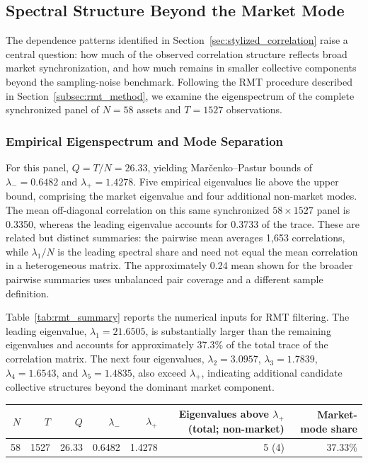 \subsection{Spectral Structure Beyond the Market Mode}
\label{sec:rmt}

The dependence patterns identified in Section~\ref{sec:stylized_correlation} raise a central question: how much of the observed correlation structure reflects broad market synchronization, and how much remains in smaller collective components beyond the sampling-noise benchmark. Following the RMT procedure described in Section~\ref{subsec:rmt_method}, we examine the eigenspectrum of the complete synchronized panel of $N=58$ assets and $T=1527$ observations.

\subsubsection{Empirical Eigenspectrum and Mode Separation
}


For this panel, $Q=T/N=26.33$, yielding Mar\v{c}enko--Pastur bounds of $\lambda_-=0.6482$ and $\lambda_+=1.4278$. Five empirical eigenvalues lie above the upper bound, comprising the market eigenvalue and four additional non-market modes. The mean off-diagonal correlation on this same synchronized $58\times1527$ panel is 0.3350, whereas the leading eigenvalue accounts for 0.3733 of the trace. These are related but distinct summaries: the pairwise mean averages 1,653 correlations, while $\lambda_1/N$ is the leading spectral share and need not equal the mean correlation in a heterogeneous matrix. The approximately 0.24 mean shown for the broader pairwise summaries uses unbalanced pair coverage and a different sample definition.

Table~\ref{tab:rmt_summary} reports the numerical inputs for RMT filtering. The leading eigenvalue, $\lambda_1=21.6505$, is substantially larger than the remaining eigenvalues and accounts for approximately 37.3\% of the total trace of the correlation matrix. The next four eigenvalues, $\lambda_2=3.0957$, $\lambda_3=1.7839$, $\lambda_4=1.6543$, and $\lambda_5=1.4835$, also exceed $\lambda_+$, indicating additional candidate collective structures beyond the dominant market component.

\begin{center}
\label{tab:rmt_summary}
\setlength{\tabcolsep}{4pt}
\begin{tabular}{rrrrrrr}
\toprule
$N$ & $T$ & $Q$ & $\lambda_-$ & $\lambda_+$ &
Eigenvalues above $\lambda_+$ (total; non-market) & Market-mode share \\
\midrule
58 & 1527 & 26.33 & 0.6482 & 1.4278 & 5 (4) & 37.33\% \\
\bottomrule
\end{tabular}
\end{center}


